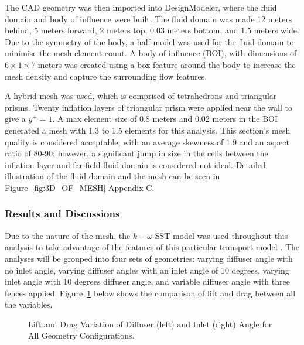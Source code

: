 \noindent The CAD geometry was then imported into DesignModeler, where the fluid domain and body of influence were built. The fluid domain was made 12 meters behind, 5 meters forward, 2 meters top, 0.03 meters bottom, and 1.5 meters wide. Due to the symmetry of the body, a half model was used for the fluid domain to minimise the mesh element count. A body of influence (BOI), with dimensions of  $6 \times 1 \times 7$ meters was created using a box feature around the body to increase the mesh density and capture the surrounding flow features.  %

\noindent A hybrid mesh was used, which is comprised of tetrahedrons and triangular prisms. Twenty inflation layers of triangular prism were applied near the wall to give a $y^+=1$. A max element size of 0.8 meters and 0.02 meters in the BOI generated a mesh with 1.3 to 1.5 elements for this analysis. This section's mesh quality is considered acceptable, with an average skewness of 1.9 and an aspect ratio of 80-90; however, a significant jump in size in the cells between the inflation layer and far-field fluid domain is considered not ideal. Detailed illustration of the fluid domain and the mesh can be seen in Figure~\ref{fig:3D_OF_MESH} Appendix C.

\subsubsection{Results and Discussions}
Due to the nature of the mesh, the $k-\omega$ SST model was used throughout this analysis to take advantage of the features of this particular transport model \cite{Ansys2006ModelingFlows}. The analyses will be grouped into four sets of geometries: varying diffuser angle with no inlet angle, varying diffuser angles with an inlet angle of 10 degrees, varying inlet angle with 10 degrees diffuser angle, and variable diffuser angle with three fences applied. Figure~\ref{fig:3D_OF_PLOT_COMPARE_ALL} below shows the comparison of lift and drag between all the variables.

\begin{figure}[htb!]
    \centering
    \noindent{}
    \caption{Lift and Drag Variation of Diffuser (left) and Inlet (right) Angle for All Geometry Configurations.}
    \label{fig:3D_OF_PLOT_COMPARE_ALL}
\end{figure}

